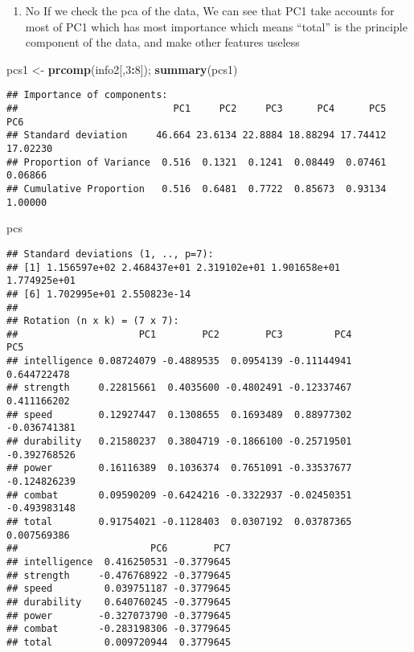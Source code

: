 \documentclass[]{article}
\newenvironment{Shaded}{\begin{snugshade}}{\end{snugshade}}
\newcommand{\DecValTok}[1]{\textcolor[rgb]{0.00,0.00,0.81}{#1}}
\newcommand{\KeywordTok}[1]{\textcolor[rgb]{0.13,0.29,0.53}{\textbf{#1}}}
\newcommand{\NormalTok}[1]{#1}
\newcommand{\OperatorTok}[1]{\textcolor[rgb]{0.81,0.36,0.00}{\textbf{#1}}}
\newcommand{\StringTok}[1]{\textcolor[rgb]{0.31,0.60,0.02}{#1}}
\providecommand{\tightlist}{%
  \setlength{\itemsep}{0pt}\setlength{\parskip}{0pt}}
\begin{document}
\begin{enumerate}
\def\labelenumi{\arabic{enumi}.}
\setcounter{enumi}{4}
\tightlist
\item
  No If we check the pca of the data, We can see that PC1 take accounts
  for most of PC1 which has most importance which means ``total'' is the
  principle component of the data, and make other features useless
\end{enumerate}

\begin{Shaded}
\begin{Highlighting}[]
\NormalTok{pcs1 <-}\StringTok{ }\KeywordTok{prcomp}\NormalTok{(info2[,}\DecValTok{3}\OperatorTok{:}\DecValTok{8}\NormalTok{]);}
\KeywordTok{summary}\NormalTok{(pcs1)}
\end{Highlighting}
\end{Shaded}

\begin{verbatim}
## Importance of components:
##                           PC1     PC2     PC3      PC4      PC5      PC6
## Standard deviation     46.664 23.6134 22.8884 18.88294 17.74412 17.02230
## Proportion of Variance  0.516  0.1321  0.1241  0.08449  0.07461  0.06866
## Cumulative Proportion   0.516  0.6481  0.7722  0.85673  0.93134  1.00000
\end{verbatim}

\begin{Shaded}
\begin{Highlighting}[]
\NormalTok{pcs}
\end{Highlighting}
\end{Shaded}

\begin{verbatim}
## Standard deviations (1, .., p=7):
## [1] 1.156597e+02 2.468437e+01 2.319102e+01 1.901658e+01 1.774925e+01
## [6] 1.702995e+01 2.550823e-14
## 
## Rotation (n x k) = (7 x 7):
##                     PC1        PC2        PC3         PC4          PC5
## intelligence 0.08724079 -0.4889535  0.0954139 -0.11144941  0.644722478
## strength     0.22815661  0.4035600 -0.4802491 -0.12337467  0.411166202
## speed        0.12927447  0.1308655  0.1693489  0.88977302 -0.036741381
## durability   0.21580237  0.3804719 -0.1866100 -0.25719501 -0.392768526
## power        0.16116389  0.1036374  0.7651091 -0.33537677 -0.124826239
## combat       0.09590209 -0.6424216 -0.3322937 -0.02450351 -0.493983148
## total        0.91754021 -0.1128403  0.0307192  0.03787365  0.007569386
##                       PC6        PC7
## intelligence  0.416250531 -0.3779645
## strength     -0.476768922 -0.3779645
## speed         0.039751187 -0.3779645
## durability    0.640760245 -0.3779645
## power        -0.327073790 -0.3779645
## combat       -0.283198306 -0.3779645
## total         0.009720944  0.3779645
\end{verbatim}
\end{document}
